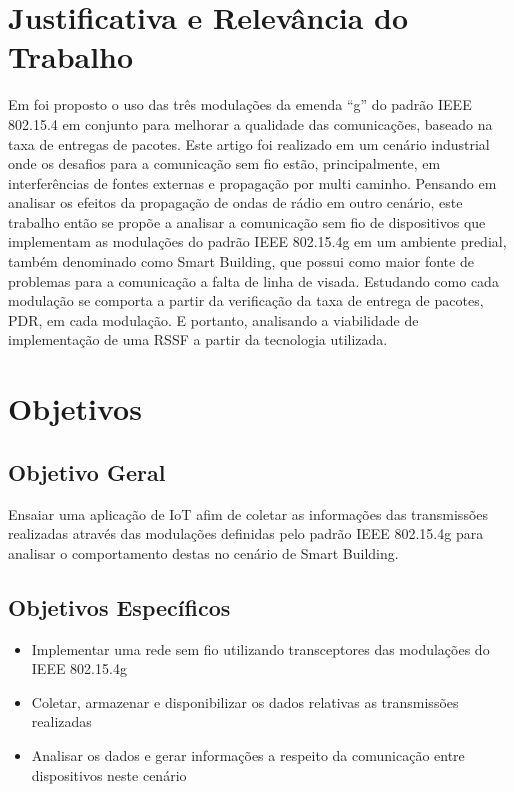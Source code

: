 \section{Justificativa e Relevância do Trabalho}
\label{sec:justificativa}
Em \cite{tuset2020dataset} foi proposto o uso das três modulações da emenda ``g'' do padrão IEEE 802.15.4 em conjunto para melhorar a qualidade das comunicações, baseado na taxa de entregas de pacotes. Este artigo foi realizado em um cenário industrial onde os desafios para a comunicação sem fio estão, principalmente, em interferências de fontes externas e propagação por multi caminho. Pensando em analisar os efeitos da propagação de ondas de rádio em outro cenário, este trabalho então se propõe a analisar a comunicação sem fio de dispositivos que implementam as modulações do padrão IEEE 802.15.4g em um ambiente predial, também denominado como Smart Building, que possui como maior fonte de problemas para a comunicação a falta de linha de visada. Estudando como cada modulação se comporta a partir da verificação da taxa de entrega de pacotes, PDR, em cada modulação. E portanto, analisando a viabilidade de implementação de uma RSSF a partir da tecnologia utilizada.

\section{Objetivos}
\label{sec:objetivos}

\subsection{Objetivo Geral}
\label{subsec:objGeral}
Ensaiar uma aplicação de IoT afim de coletar as informações das transmissões realizadas através das modulações definidas pelo padrão IEEE 802.15.4g para analisar o comportamento destas no cenário de Smart Building.


\subsection{Objetivos Específicos}
\label{subsec:objespecificos}
\begin{itemize}
    \item Implementar uma rede sem fio utilizando transceptores das modulações do IEEE 802.15.4g
    \item Coletar, armazenar e disponibilizar os dados relativas as transmissões realizadas
    \item Analisar os dados e gerar informações a respeito da comunicação entre dispositivos neste cenário
\end{itemize}


